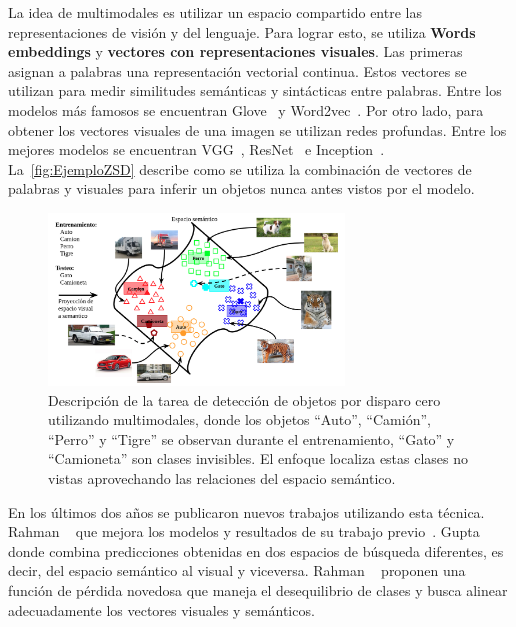 La idea de multimodales es utilizar un espacio compartido entre las representaciones de visión y del lenguaje. Para lograr esto, se utiliza  \textbf{Words embeddings} y \textbf{vectores con representaciones visuales}. Las primeras asignan a palabras una representación vectorial continua. Estos vectores se utilizan para medir similitudes semánticas y sintácticas entre palabras. Entre los modelos más famosos se encuentran Glove~\cite{pennington-etal-2014-glove} y Word2vec~\cite{mikolov2013efficient}. Por otro lado, para obtener los vectores visuales de una imagen se utilizan redes profundas. Entre los mejores modelos se encuentran VGG~\cite{simonyan2014very}, ResNet~\cite{resnet} e Inception~\cite{Szegedy_2015_CVPR}. La~\autoref{fig:EjemploZSD} describe como se utiliza la combinación de vectores de palabras y visuales para inferir un objetos nunca antes vistos por el modelo.\\

\begin{figure}[]
	\centering
	\includegraphics[width=0.7\textwidth]{img/Modelo.png}
	\caption{Descripción de la tarea de detección de objetos por disparo cero utilizando multimodales, donde los objetos ``Auto'', ``Camión'', ``Perro'' y ``Tigre'' se observan  durante el entrenamiento,  ``Gato'' y ``Camioneta'' son clases invisibles. El enfoque localiza estas clases no vistas aprovechando las relaciones del espacio semántico.}
	\label{fig:EjemploZSD}
\end{figure}

En los últimos dos años se publicaron nuevos trabajos utilizando esta técnica. Rahman \etal~\cite{rahman2020zero} que mejora los modelos y resultados de su trabajo previo~\cite{rahman2018zero}. Gupta \etal~\cite{gupta2020multi} donde combina predicciones obtenidas en dos espacios de búsqueda diferentes, es decir, del espacio semántico al visual y viceversa. Rahman \etal~\cite{rahman2020improved} proponen  una función de pérdida novedosa que maneja el desequilibrio de clases y busca alinear adecuadamente los vectores visuales y semánticos.

